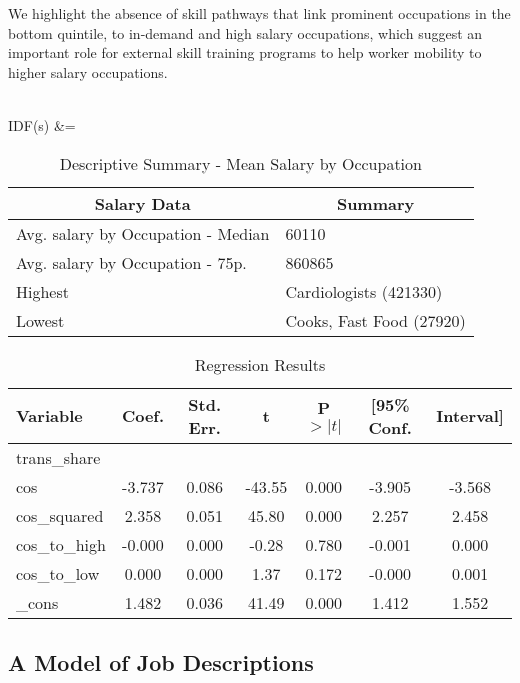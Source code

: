 \documentclass{article}
\begin{document}
We highlight the absence of skill pathways that link  prominent occupations in the bottom quintile, to in-demand and high salary occupations, which suggest an important role for external skill training programs to help worker mobility to higher salary occupations. 


\\
IDF(s) &= \log {}



\begin{table}
\centering
\begin{tabular}{l|l}
\toprule
\multicolumn{1}{c}{\textbf{Salary Data}} & \multicolumn{1}{c}{\textbf{Summary}} \\
\midrule
Avg. salary by Occupation - Median & 60110 \\
Avg. salary by Occupation - 75p. & 860865\\
Highest & Cardiologists (421330) \\
Lowest & Cooks, Fast Food (27920) \\
\bottomrule
\end{tabular}
\caption{Descriptive Summary - Mean Salary by Occupation}
\label{table:salary}
\end{table}







\begin{table}[htbp]
\centering
\caption{Regression Results}
\begin{tabular}{lcccccc}
\toprule
Variable & Coef. & Std. Err. & t & P$>|t|$ & [95\% Conf. & Interval] \\
\midrule
trans\_share & & & & & & \\
cos & -3.737 & 0.086 & -43.55 & 0.000 & -3.905 & -3.568 \\
cos\_squared & 2.358 & 0.051 & 45.80 & 0.000 & 2.257 & 2.458 \\
cos\_to\_high & -0.000 & 0.000 & -0.28 & 0.780 & -0.001 & 0.000 \\
cos\_to\_low & 0.000 & 0.000 & 1.37 & 0.172 & -0.000 & 0.001 \\
\_cons & 1.482 & 0.036 & 41.49 & 0.000 & 1.412 & 1.552 \\
\bottomrule
\end{tabular}
\end{table}





\subsection{A Model of Job Descriptions}
\end{document}
